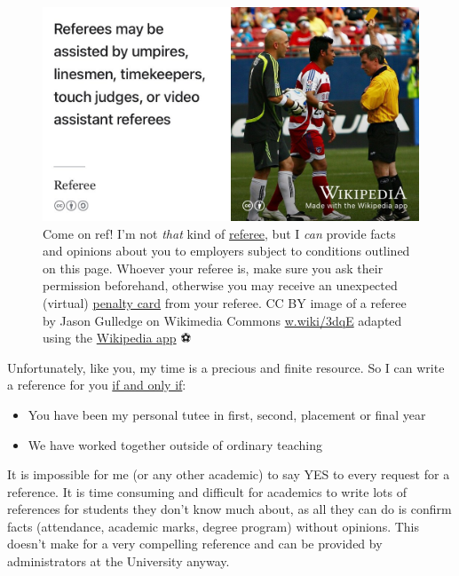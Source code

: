 \documentclass[
  12pt,
]{book}
\providecommand{\tightlist}{%
  \setlength{\itemsep}{0pt}\setlength{\parskip}{0pt}}
\begin{document}
\begin{figure}

{\centering \includegraphics[width=0.99\linewidth]{images/referee} 

}

\caption{Come on ref! I'm not \emph{that} kind of \href{https://en.wikipedia.org/wiki/Referee}{referee}, but I \emph{can} provide facts and opinions about you to employers subject to conditions outlined on this page. Whoever your referee is, make sure you ask their permission beforehand, otherwise you may receive an unexpected (virtual) \href{https://en.wikipedia.org/wiki/Penalty_card}{penalty card} from your referee. CC BY image of a referee by Jason Gulledge on Wikimedia Commons \href{https://w.wiki/3dqE}{w.wiki/3dqE} adapted using the \href{https://apps.apple.com/us/app/wikipedia/id324715238}{Wikipedia app} ⚽️}\label{fig:referee-fig}
\end{figure}



Unfortunately, like you, my time is a precious and finite resource. So I can write a reference for you \href{https://en.wikipedia.org/wiki/If_and_only_if}{if and only if}:

\begin{itemize}
\tightlist
\item
  You have been my personal tutee in first, second, placement or final year
\item
  We have worked together outside of ordinary teaching
\end{itemize}

It is impossible for me (or any other academic) to say YES to every request for a reference. It is time consuming and difficult for academics to write lots of references for students they don't know much about, as all they can do is confirm facts (attendance, academic marks, degree program) without opinions. This doesn't make for a very compelling reference and can be provided by administrators at the University anyway.
\end{document}
